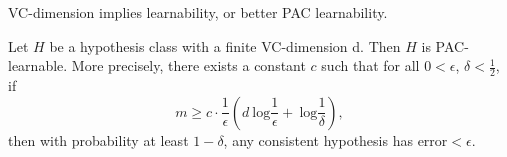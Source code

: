 VC-dimension implies learnability, or better PAC learnability.
\begin{definition}
    Let $H$ be a hypothesis class with a finite VC-dimension d. Then $H$ is PAC-learnable. More precisely, there exists a constant $c$ such that for all 
    $0 < \epsilon$, $\delta < \frac{1}{2}$, if
    $$m \geq c \cdot \frac{1}{\epsilon}(d \ \text{log} \frac{1}{\epsilon} + \ \text{log}\frac{1}{\delta}),$$
    then with probability at least $1 - \delta$, any consistent hypothesis has $\text{error} < \epsilon$.
\end{definition}